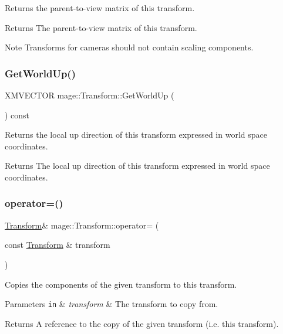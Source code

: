 Returns the parent-\/to-\/view matrix of this transform.

\begin{DoxyReturn}{Returns}
The parent-\/to-\/view matrix of this transform. 
\end{DoxyReturn}
\begin{DoxyNote}{Note}
Transforms for cameras should not contain scaling components. 
\end{DoxyNote}
\hypertarget{structmage_1_1_transform_af28786b745a144eef74d69a55055b00a}{}\label{structmage_1_1_transform_af28786b745a144eef74d69a55055b00a} 
\subsubsection{\texorpdfstring{Get\+World\+Up()}{GetWorldUp()}}
{\footnotesize\ttfamily X\+M\+V\+E\+C\+T\+OR mage\+::\+Transform\+::\+Get\+World\+Up (\begin{DoxyParamCaption}{ }\end{DoxyParamCaption}) const}

Returns the local up direction of this transform expressed in world space coordinates.

\begin{DoxyReturn}{Returns}
The local up direction of this transform expressed in world space coordinates. 
\end{DoxyReturn}
\hypertarget{structmage_1_1_transform_a40bc8c32b09dc419d0573fffcd938644}{}\label{structmage_1_1_transform_a40bc8c32b09dc419d0573fffcd938644} 
\subsubsection{\texorpdfstring{operator=()}{operator=()}}
{\footnotesize\ttfamily \hyperlink{structmage_1_1_transform}{Transform}\& mage\+::\+Transform\+::operator= (\begin{DoxyParamCaption}\item[{const \hyperlink{structmage_1_1_transform}{Transform} \&}]{transform }\end{DoxyParamCaption})}

Copies the components of the given transform to this transform.


\begin{DoxyParams}[1]{Parameters}
\mbox{\tt in}  & {\em transform} & The transform to copy from. \\
\hline
\end{DoxyParams}
\begin{DoxyReturn}{Returns}
A reference to the copy of the given transform (i.\+e. this transform). 
\end{DoxyReturn}
\hypertarget{structmage_1_1_transform_a1f9e00affb4b41338a6a946867a1d5a4}{}\label{structmage_1_1_transform_a1f9e00affb4b41338a6a946867a1d5a4} 

